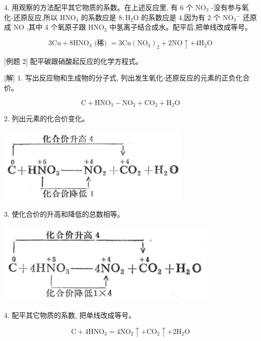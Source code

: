 \documentclass[10pt]{article}
\begin{document}
4. 用观察的方法配平其它物质的系数。在上述反应里, 有 6 个 \({\mathrm{{NO}}}_{3}\) -没有参与氧化-还原反应,所以 \({\mathrm{{HNO}}}_{3}\) 的系数应是 \(8;{\mathrm{H}}_{2}\mathrm{O}\) 的系数应是 4,因为有 2 个 \({\mathrm{{NO}}}_{3}{}^{ - }\) 还原成 \(\mathrm{{NO}}\) ,其中 4 个氧原子跟 \({\mathrm{{HNO}}}_{3}\) 中氢离子结合成水。配平后,把单线改成等号。

\[
3\mathrm{{Cu}} + 8{\mathrm{{HNO}}}_{3}\text{ (稀) } = 3\mathrm{{Cu}}{\left( {\mathrm{{NO}}}_{3}\right) }_{2} + 2\mathrm{{NO}} \uparrow + 4{\mathrm{H}}_{2}\mathrm{O}
\]

[例题 2] 配平碳跟硝酸起反应的化学方程式。

[解] 1. 写出反应物和生成物的分子式, 列出发生氧化-还原反应的元素的正负化合价。

\[
\mathrm{C} + {\mathrm{{HNO}}}_{3} - {\mathrm{{NO}}}_{2} + {\mathrm{{CO}}}_{2} + {\mathrm{H}}_{2}\mathrm{O}
\]

2. 列出元素的化合价变化。

\begin{center}
\includegraphics[max width=0.7\textwidth]{images/01912d13-9986-7822-a012-3f3f7be99dcb_55_630813.jpg}
\end{center}

3. 使化合价的升高和降低的总数相等。

\begin{center}
\includegraphics[max width=0.8\textwidth]{images/01912d13-9986-7822-a012-3f3f7be99dcb_56_435659.jpg}
\end{center}

4. 配平其它物质的系数, 把单线改成等号。

\[
\mathrm{C} + 4{\mathrm{{HNO}}}_{3} = 4{\mathrm{{NO}}}_{2} \uparrow + {\mathrm{{CO}}}_{2} \uparrow + 2{\mathrm{H}}_{2}\mathrm{O}
\]
\end{document}
